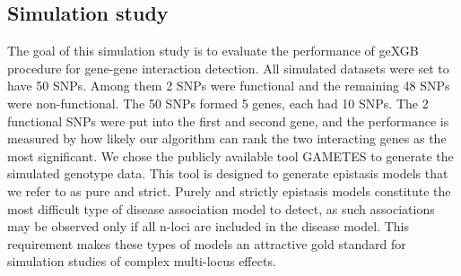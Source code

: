 \documentclass[11pt]{article}
\theoremstyle{plain}
\theoremstyle{definition}
\theoremstyle{remark}
\begin{document}



\subsection{Simulation study}

The goal of this simulation study is to evaluate the performance of geXGB procedure for gene-gene interaction detection. All simulated datasets were set to have 50 SNPs. Among them 2 SNPs were functional and the remaining 48 SNPs were non-functional. The 50 SNPs formed 5 genes, each had 10 SNPs. The 2 functional SNPs were put into the first and second gene, and the performance is measured by how likely our algorithm can rank the two interacting genes as the most significant. We chose the publicly available tool GAMETES \cite{11} to generate the simulated genotype data. This tool is designed to generate epistasis models that we refer to as pure and strict. Purely and strictly epistasis models constitute the most difficult type of disease association model to detect, as such associations may be observed only if all n-loci are included in the disease model. This requirement makes these types of models an attractive gold standard for simulation studies of complex multi-locus effects. \\
\end{document}
